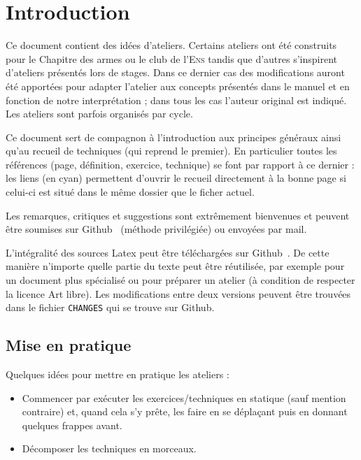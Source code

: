 \section*{Introduction}


Ce document contient des idées d'ateliers.
Certains ateliers ont été construits pour le Chapitre des armes ou le club de l'\textsc{Ens} tandis que d'autres s'inspirent d'ateliers présentés lors de stages.
Dans ce dernier cas des modifications auront été apportées pour adapter l'atelier aux concepts présentés dans le manuel et en fonction de notre interprétation ; dans tous les cas l'auteur original est indiqué.
Les ateliers sont parfois organisés par cycle.

Ce document sert de compagnon à l'introduction aux principes généraux ainsi qu'au recueil de techniques (qui reprend le premier).
En particulier toutes les références (page, définition, exercice, technique) se font par rapport à ce dernier : les liens (en cyan) permettent d'ouvrir le recueil directement à la bonne page si celui-ci est situé dans le même dossier que le ficher actuel.

Les remarques, critiques et suggestions sont extrêmement bienvenues et peuvent être soumises sur Github~\footnotemark{} (méthode privilégiée) ou envoyées par mail.

L'intégralité des sources Latex peut être téléchargées sur Github~\footnotemark{}.%
De cette manière n'importe quelle partie du texte peut être réutilisée, par exemple pour un document plus spécialisé ou pour préparer un atelier (à condition de respecter la licence Art libre).
Les modifications entre deux versions peuvent être trouvées dans le fichier \texttt{CHANGES} qui se trouve sur Github.




\subsection{Mise en pratique}


\noindent
Quelques idées pour mettre en pratique les ateliers :
\begin{itemize}
	\item Commencer par exécuter les exercices/techniques en statique (sauf mention contraire) et, quand cela s'y prête, les faire en se déplaçant puis en donnant quelques frappes avant.
	
	\item Décomposer les techniques en morceaux.
\end{itemize}

